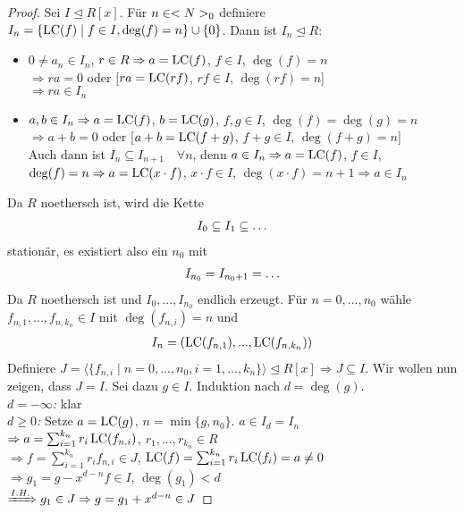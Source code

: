 \begin{proof}
	Sei $I\unlhd R[x]$. Für $n\in<N>_0$ definiere $I_n = \{\operatorname{LC}(f)\mid f\in I,\deg(f)=n\}\cup \{0\}$. Dann ist $I_n\unlhd R$:
	\begin{itemize}
		\item $0\neq a_n\in I_n$, $r\in R\Rightarrow a=\operatorname{LC}(f)$, $f\in I$, $\deg(f)=n$ \\
		$\Rightarrow ra=0$ oder [$ra=\operatorname{LC}(rf)$, $rf\in I$, $\deg(rf)=n$] \\
		$\Rightarrow ra\in I_n$
		\item $a,b\in I_n\Rightarrow a=\operatorname{LC}(f)$, $b=\operatorname{LC}(g)$, $f,g\in I$, $\deg(f)=\deg(g)=n$ \\
		$\Rightarrow a+b=0$ oder  [$a+b=\operatorname{LC}(f+g)$, $f+g\in I$, $\deg(f+g)=n$] \\
		Auch dann ist $I_n\subseteq I_{n+1}\quad\forall n$, denn $a\in I_n\Rightarrow a = \operatorname{LC}(f)$, $f\in I$, $\deg(f)=n\Rightarrow a=\operatorname{LC}(x\cdot f)$, $x\cdot f\in I$, $\deg(x\cdot f)=n+1\Rightarrow a\in I_n$ 
	\end{itemize}
	Da $R$ noethersch ist, wird die Kette
	\begin{align}
		I_0 \subseteq I_1\subseteq \dots \notag
	\end{align}
	stationär, es existiert also ein $n_0$ mit
	\begin{align}
		I_{n_0} = I_{n_0+1} = \dots\notag
	\end{align}
	Da $R$ noethersch ist und $I_0,...,I_{n_0}$ endlich erzeugt. Für $n=0,...,n_0$ wähle $f_{n,1},...,f_{n,k_n}\in I$ mit $\deg(f_{n,i})=n$ und 
	\begin{align}
		I_n = (\operatorname{LC}(f_{n,1}),...,\operatorname{LC}(f_{n,k_n})) \notag
	\end{align}
	Definiere $J=\langle \{f_{n,i}\mid  n=0,...,n_0,i=1,...,k_n\}\rangle\unlhd R[x]\Rightarrow J\subseteq I$. Wir wollen nun zeigen, dass $J=I$. Sei dazu $g\in I$. Induktion nach $d=\deg(g)$. \\
	\emph{$d=-\infty$:} klar \\
	\emph{$d\ge 0$:} Setze $a=\operatorname{LC}(g)$, $n=\min\{g,n_0\}$. $a\in I_d=I_n$ \\
	$\Rightarrow a = \sum_{i=1}^{k_n} r_i\operatorname{LC}(f_{n,i})$, $r_1,...,r_{k_n}\in R$\\
	$\Rightarrow f = \sum_{i=1}^{k_n} r_i f_{n,i}\in J$, $\operatorname{LC}(f) = \sum_{i=1}^{k_n} r_i\operatorname{LC}(f_i)=a\neq 0$ \\
	$\Rightarrow g_1 = g - x^{d-n}f\in I$, $\deg(g_1)<d$ \\
	$\xRightarrow{I.H.} g_1\in J\Rightarrow g = g_1+x^{d-n}\in J$
\end{proof}

